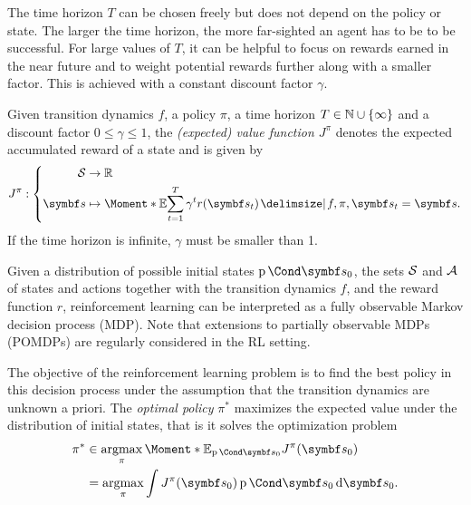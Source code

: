 The time horizon $T$ can be chosen freely but does not depend on the policy or state.
The larger the time horizon, the more far-sighted an agent has to be to be successful.
For large values of $T$, it can be helpful to focus on rewards earned in the near future and to weight potential rewards further along with a smaller factor.
This is achieved with a constant discount factor $\gamma$.
\begin{definition}
    \label{def:reinforcement_learning:old_value_function}
    Given transition dynamics $f$, a policy $\pi$, a time horizon $T \in \mathbb{N} \cup \left\{ \infty \right\}$ and a discount factor $0 \leq \gamma \leq 1$, the \emph{(expected) value function $J^\pi$} denotes the expected accumulated reward of a state and is given by
    \begin{align}
        J^\pi : \left\{
            \begin{aligned}
                \Sc &\to \Rb \\
                \mat{s} &\mapsto \Moment*{\E}{\sum_{t=1}^T \gamma^t r(\mat{s}_t) \given f, \pi, \mat{s}_t = \mat{s}}.
            \end{aligned}
        \right.
    \end{align}
    If the time horizon is infinite, $\gamma$ must be smaller than 1.
\end{definition}

Given a distribution of possible initial states $\Prob{\mat{s}_0}$, the sets $\mathcal{S}$ and $\mathcal{A}$ of states and actions together with the transition dynamics $f$, and the reward function $r$, reinforcement learning can be interpreted as a fully observable Markov decision process (MDP).
Note that extensions to partially observable MDPs (POMDPs) are regularly considered in the RL setting.

The objective of the reinforcement learning problem is to find the best policy in this decision process under the assumption that the transition dynamics are unknown a priori.
The \emph{optimal policy} $\pi^*$ maximizes the expected value under the distribution of initial states, that is it solves the optimization problem
\begin{align}
    \label{eq:reinforcement_learning:optimal_policy}
    \begin{split}
        \pi^\ast &\in \argmax_{\pi} \Moment*{\E_{\Prob{\mat{s}_0}}}{J^\pi(\mat{s}_0)} \\
        &= \argmax_{\pi} \int J^\pi(\mat{s}_0) \Prob{\mat{s}_0} \diff \mat{s}_0.
    \end{split}
\end{align}


